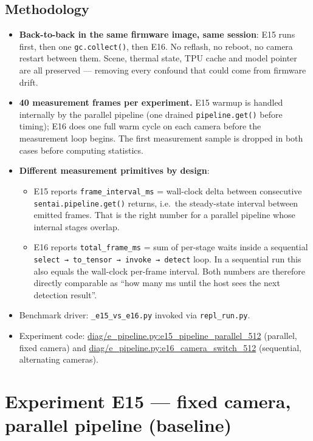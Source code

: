 \subsection{Methodology}\label{methodology}

\begin{itemize}
\tightlist
\item
  \textbf{Back-to-back in the same firmware image, same session}: E15
  runs first, then one \texttt{gc.collect()}, then E16. No reflash, no
  reboot, no camera restart between them. Scene, thermal state, TPU
  cache and model pointer are all preserved --- removing every confound
  that could come from firmware drift.
\item
  \textbf{40 measurement frames per experiment.} E15 warmup is handled
  internally by the parallel pipeline (one drained
  \texttt{pipeline.get()} before timing); E16 does one full warm cycle
  on each camera before the measurement loop begins. The first
  measurement sample is dropped in both cases before computing
  statistics.
\item
  \textbf{Different measurement primitives by design}:

  \begin{itemize}
  \tightlist
  \item
    E15 reports \texttt{frame\_interval\_ms} = wall-clock delta between
    consecutive \texttt{sentai.pipeline.get()} returns, i.e.~the
    steady-state interval between emitted frames. That is the right
    number for a parallel pipeline whose internal stages overlap.
  \item
    E16 reports \texttt{total\_frame\_ms} = sum of per-stage waits
    inside a sequential
    \texttt{select\ →\ to\_tensor\ →\ invoke\ →\ detect} loop. In a
    sequential run this also equals the wall-clock per-frame interval.
    Both numbers are therefore directly comparable as ``how many ms
    until the host sees the next detection result''.
  \end{itemize}
\item
  Benchmark driver: \texttt{\_e15\_vs\_e16.py} invoked via
  \texttt{repl\_run.py}.
\item
  Experiment code:
  \href{../diag/e_pipeline.py}{diag/e\_pipeline.py:e15\_pipeline\_parallel\_512}
  (parallel, fixed camera) and
  \href{../diag/e_pipeline.py}{diag/e\_pipeline.py:e16\_camera\_switch\_512}
  (sequential, alternating cameras).
\end{itemize}

\section{Experiment E15 --- fixed camera, parallel pipeline
(baseline)}\label{experiment-e15-fixed-camera-parallel-pipeline-baseline}

